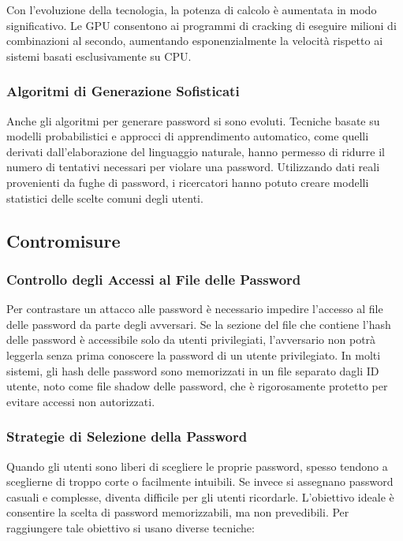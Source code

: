 Con l'evoluzione della tecnologia, la potenza di calcolo è aumentata in modo significativo. Le GPU consentono ai programmi di cracking di eseguire milioni di combinazioni al secondo, aumentando esponenzialmente la velocità rispetto ai sistemi basati esclusivamente su CPU.

\subsubsection{Algoritmi di Generazione Sofisticati}

Anche gli algoritmi per generare password si sono evoluti. Tecniche basate su modelli probabilistici e approcci di apprendimento automatico, come quelli derivati dall'elaborazione del linguaggio naturale, hanno permesso di ridurre il numero di tentativi necessari per violare una password. Utilizzando dati reali provenienti da fughe di password, i ricercatori hanno potuto creare modelli statistici delle scelte comuni degli utenti.

\subsection{Contromisure}

\subsubsection{Controllo degli Accessi al File delle Password}

Per contrastare un attacco alle password è necessario impedire l'accesso al file delle password da parte degli avversari. Se la sezione del file che contiene l'hash delle password è accessibile solo da utenti privilegiati, l'avversario non potrà leggerla senza prima conoscere la password di un utente privilegiato. In molti sistemi, gli hash delle password sono memorizzati in un file separato dagli ID utente, noto come file shadow delle password, che è rigorosamente protetto per evitare accessi non autorizzati.

\subsubsection{Strategie di Selezione della Password}

Quando gli utenti sono liberi di scegliere le proprie password, spesso tendono a sceglierne di troppo corte o facilmente intuibili. Se invece si assegnano password casuali e complesse, diventa difficile per gli utenti ricordarle. L'obiettivo ideale è consentire la scelta di password memorizzabili, ma non prevedibili. Per raggiungere tale obiettivo si usano diverse tecniche:


